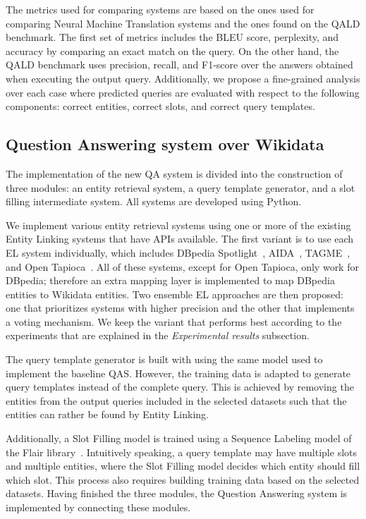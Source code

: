 The metrics used for comparing systems are based on the ones used for comparing Neural 
Machine Translation systems and the ones found on the QALD benchmark. The first set of 
metrics includes the BLEU score, perplexity, and accuracy by comparing an exact match on 
the \SPARQL{} query. On the other hand, the QALD benchmark uses precision, recall, and F1-score 
over the answers obtained when executing the output \SPARQL{} query. Additionally, 
we propose a fine-grained analysis over each case where predicted queries are evaluated with 
respect to the following components: correct entities, correct slots, and correct query 
templates.

\subsection*{Question Answering system over Wikidata}
\label{cap1:intro/contributions/qaWikidata}
The implementation of the new QA system is divided into the construction of three modules: 
an entity retrieval system, a query template generator, and a slot filling intermediate 
system. All systems are developed using Python.

We implement various entity retrieval systems using one or more of the existing Entity 
Linking systems that have APIs available. The first variant is to use each EL system individually, 
which includes DBpedia Spotlight~\cite{EL:dbpedia-spotlight-MendesJGB11}, AIDA~\cite{EL:aida-tool-YosefHBSW11}, 
TAGME~\cite{EL:tagme-FerraginaS10}, and Open Tapioca~\cite{EL:opentapioca-Delpeuch19}. 
All of these systems, except for Open Tapioca, only work for DBpedia; therefore an 
extra mapping layer is implemented to map DBpedia entities to Wikidata entities. Two ensemble 
EL approaches are then proposed: one that prioritizes systems with higher precision 
and the other that implements a voting mechanism. We keep the variant that performs best 
according to the experiments that are explained in the \textit{Experimental results} subsection.

The query template generator is built with using the same model used to implement the baseline QAS. 
However, the training data is adapted to generate query templates instead of the complete 
query. This is achieved by removing the entities from the output \SPARQL{} queries included 
in the selected datasets such that the entities can rather be found by Entity Linking.

Additionally, a Slot Filling model is trained using a Sequence Labeling model of the Flair 
library~\cite{seqlab:flair-AkbikBBRSV19}. Intuitively speaking, a query template may have 
multiple slots and multiple entities, where the Slot Filling model decides which entity should 
fill which slot. This process also requires building training data based on the selected datasets. 
Having finished the three modules, the Question Answering system is implemented by 
connecting these modules.

